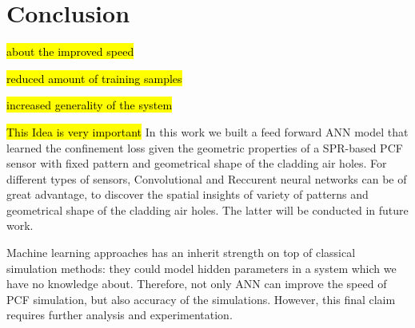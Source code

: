 \documentclass[draft, 10pt]{IEEEtran}
\begin{document}
\section{Conclusion}
\label{sec:conc}

\hl{about the improved speed}

\hl{reduced amount of training samples}

\hl{increased generality of the system}

\hl{This Idea is very important}
In this work we built a feed forward ANN model that learned the confinement loss given the geometric properties of a SPR-based PCF sensor with fixed pattern and geometrical shape of the cladding air holes. For different types of sensors, Convolutional and Reccurent neural networks can be of great advantage, to discover the spatial insights of variety of patterns and  geometrical shape of the cladding air holes. The latter will be conducted in future work.

Machine learning approaches has an inherit strength on top of classical simulation methods: they could model hidden parameters in a system which we have no knowledge about. Therefore, not only ANN can improve the speed of PCF simulation, but also accuracy of the simulations. However, this final claim requires further analysis and experimentation.


	
\end{document}
